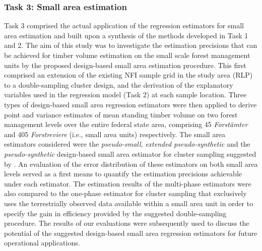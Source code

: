 
\subsubsection{Task 3: Small area estimation} %


Task 3 comprised the actual application of the regression estimators for small area estimation and built upon a synthesis of the methods developed in Task 1 and 2. The aim of this study was to investigate the estimation precisions that can be achieved for timber volume estimation on the small scale forest management units by the proposed design-based small area estimation procedure. This first comprised an extension of the existing NFI sample grid in the study area (RLP) to a double-sampling cluster design, and the derivation of the explanatory variables used in the regression model (Task 2) at each sample location. Three types of design-based small area regression estimators were then applied to derive point and variance estimates of mean standing timber volume on two forest management levels over the entire federal state area, comprising 45 \textit{Forst{\"a}mter} and 405 \textit{Forstreviere} (i.e., small area units) respectively. The small area estimators considered were the \textit{pseudo-small}, \textit{extended pseudo-synthetic} and the \textit{pseudo-synthetic} design-based small area estimator for cluster sampling suggested by \citet{mandallaz2013a, mandallaz2013b}. An evaluation of the error distribution of these estimators on both small area levels served as a first means to quantify the estimation precisions achievable under each estimator. The estimation results of the multi-phase estimators were also compared to the one-phase estimator for cluster sampling that exclusively uses the terrestrially observed data available within a small area unit in order to specify the gain in efficiency provided by the suggested double-sampling procedure. The results of our evaluations were subsequently used to discuss the potential of the suggested design-based small area regression estimators for future operational applications.

